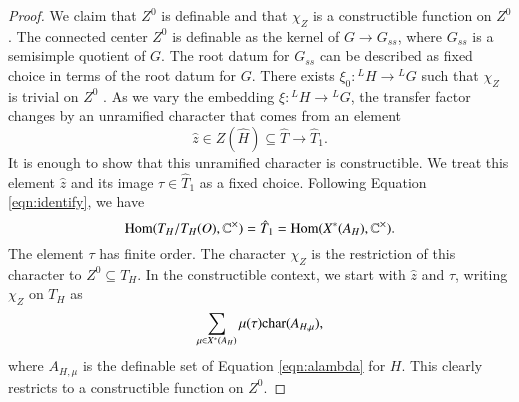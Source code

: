 \begin{proof}


We claim that $Z^0$ is definable and that $\chi_Z$ is a constructible
function on $Z^0$.  The connected center $Z^0$ is definable as the
kernel of $G\to G_{ss}$, where $G_{ss}$ is a semisimple quotient of
$G$.  The root datum for $G_{ss}$ can be described as 
fixed choice in terms of the root datum for $G$.
There exists $\xi_0:{}^LH\to {}^LG$ such that $\chi_Z$ is
trivial on $Z^0$ \cite[Lemma 3.6]{hales1995fundamental}.  As we vary
the embedding $\xi:{}^LH\to{}^LG$, the transfer factor changes by an
unramified character that comes from an element
\[
\hat z\in Z(\hat H) \subseteq \hat T \to \hat T_1.
\]
It is enough to show that this unramified character is constructible.
We treat this element $\hat z$ and its image $\tau\in \hat T_1$ as a fixed choice.
Following Equation \ref{eqn:identify}, we have
\[
{\operatorname{Hom}}(T_H/T_H(O),\mathbb{C}^\times) = \hat T_1 = {\operatorname{Hom}}(X^*(A_H),\mathbb{C}^\times).
\]
The element $\tau$ has finite order.   The character $\chi_Z$ is the restriction
of this character to $Z^0 \subseteq T_H$.  In the constructible context, we
start with $\hat z$ and $\tau$, writing $\chi_Z$ on $T_H$ as
\[
\sum_{\mu\in X^*(A_H)} \mu(\tau){\operatorname{char}}(A_{H,\mu}),
\]
where $A_{H,\mu}$ is the definable set of Equation \ref{eqn:alambda}
for $H$.  This clearly restricts to a constructible function on $Z^0$.



\end{proof}
